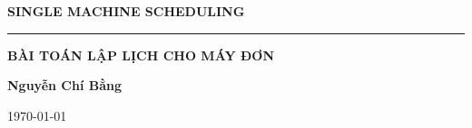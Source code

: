 \documentclass[12pt,a4paper]{report}
\begin{document}
 
    \begin{titlepage}
	\centering
    \phantom{}\par
	\vspace{3cm}
	{\LARGE\textbf{SINGLE MACHINE SCHEDULING}\par}
	\vspace{1cm}
	\rule{5cm}{0.5pt}\par
	\vspace{1cm}
		{\LARGE\textbf{BÀI TOÁN LẬP LỊCH CHO MÁY ĐƠN}\par}
	\vspace{1cm}
	\Large\textbf{Nguyễn Chí Bằng}\par		
	\vspace{1cm}
    \today
    \end{titlepage}

\newpage
\thispagestyle{empty} %
\mbox{}

	\tableofcontents

	\newpage
	\thispagestyle{empty} %
	\mbox{}
\end{document}
